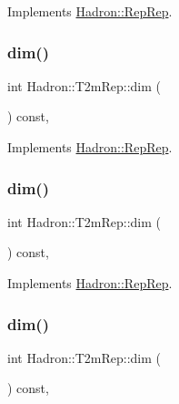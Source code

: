 Implements \mbox{\hyperlink{structHadron_1_1RepRep_a92c8802e5ed7afd7da43ccfd5b7cd92b}{Hadron\+::\+Rep\+Rep}}.

\mbox{\label{structHadron_1_1T2mRep_abd34f4a53af78200eaf2e03661f8af73}} 
\subsubsection{\texorpdfstring{dim()}{dim()}\hspace{0.1cm}{\footnotesize\ttfamily [3/5]}}
{\footnotesize\ttfamily int Hadron\+::\+T2m\+Rep\+::dim (\begin{DoxyParamCaption}{ }\end{DoxyParamCaption}) const\hspace{0.3cm}{\ttfamily [inline]}, {\ttfamily [virtual]}}



Implements \mbox{\hyperlink{structHadron_1_1RepRep_a92c8802e5ed7afd7da43ccfd5b7cd92b}{Hadron\+::\+Rep\+Rep}}.

\mbox{\label{structHadron_1_1T2mRep_abd34f4a53af78200eaf2e03661f8af73}} 
\subsubsection{\texorpdfstring{dim()}{dim()}\hspace{0.1cm}{\footnotesize\ttfamily [4/5]}}
{\footnotesize\ttfamily int Hadron\+::\+T2m\+Rep\+::dim (\begin{DoxyParamCaption}{ }\end{DoxyParamCaption}) const\hspace{0.3cm}{\ttfamily [inline]}, {\ttfamily [virtual]}}



Implements \mbox{\hyperlink{structHadron_1_1RepRep_a92c8802e5ed7afd7da43ccfd5b7cd92b}{Hadron\+::\+Rep\+Rep}}.

\mbox{\label{structHadron_1_1T2mRep_abd34f4a53af78200eaf2e03661f8af73}} 
\subsubsection{\texorpdfstring{dim()}{dim()}\hspace{0.1cm}{\footnotesize\ttfamily [5/5]}}
{\footnotesize\ttfamily int Hadron\+::\+T2m\+Rep\+::dim (\begin{DoxyParamCaption}{ }\end{DoxyParamCaption}) const\hspace{0.3cm}{\ttfamily [inline]}, {\ttfamily [virtual]}}



